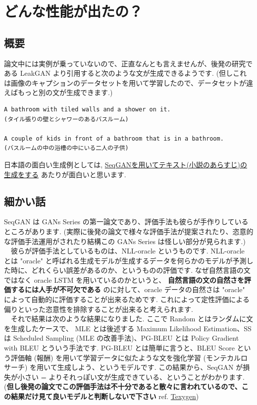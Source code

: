 \documentclass[a4paper, dvipdfmx, 10pt]{article}
\begin{document}
\section{どんな性能が出たの？}
\label{sec:orgca47a28}
\subsection{概要}
\label{sec:org6333684}
論文中には実例が乗っていないので、正直なんとも言えませんが、後発の研究である LeakGAN より引用すると次のような文が生成できるようです. (但しこれは画像のキャプションのデータセットを用いて学習したので、データセットが違えばもっと別の文が生成できます.)

\begin{verbatim}
A bathroom with tiled walls and a shower on it.
(タイル張りの壁とシャワーのあるバスルーム)

A couple of kids in front of a bathroom that is in a bathroom.
(バスルームの中の浴槽の中にいる二人の子供)
\end{verbatim}

日本語の面白い生成例としては, \href{https://qiita.com/knok/items/5e079420f05ddfc1ae75}{SeqGANを用いてテキスト(小説のあらすじ)の生成をする} あたりが面白いと思います.
\subsection{細かい話}
\label{sec:orgaae0fb1}
SeqGAN は GANs Series の第一論文であり、評価手法も彼らが手作りしているところがあります. (実際に後発の論文で様々な評価手法が提案されたり、恣意的な評価手法運用がされたり結構この GANs Series は怪しい部分が見られます.)\\
　彼らが評価手法としているものは、NLL-oracle というものです. NLL-oracle とは "oracle" と呼ばれる生成モデルが生成するデータを何らかのモデルが予測した時に、どれくらい誤差があるのか、というものの評価です. なぜ自然言語の文ではなく oracle LSTM を用いているのかというと、 \textbf{自然言語の文の自然さを評価するには人手が不可欠である} のに対して、oracle データの自然さは "oracle" によって自動的に評価することが出来るためです. これによって定性評価による偏りといった恣意性を排除することが出来ると考えられます.\\
　それで結果は次のような結果になりました. ここで Random とはランダムに文を生成したケースで、 MLE とは後述する Maximum Likelihood Estimation、SS は Scheduled Sampling (MLE の改善手法)、PG-BLEU とは Policy Gradient with BLEU とういう手法です. PG-BLEU とは簡単に言うと、BLEU Score という評価軸 (報酬) を用いて学習データに似たような文を強化学習 (モンテカルロサーチ) を用いて生成しよう、というモデルです. この結果から、SeqGAN が損失が小さい = よりそれっぽい文が生成できている、ということがわかります. (\textbf{但し後発の論文でこの評価手法は不十分であると散々に言われているので、この結果だけ見て良いモデルと判断しないで下さい} ref. \href{https://arxiv.org/abs/1802.01886}{Texygen})
\end{document}
